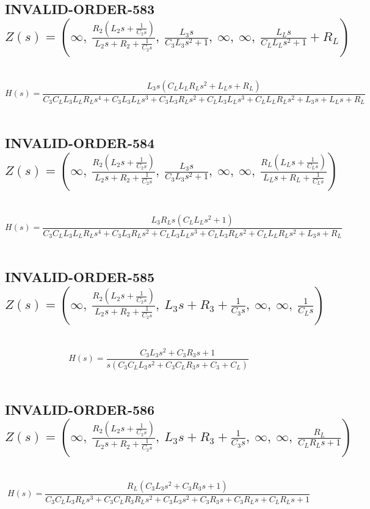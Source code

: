 \documentclass{article}
\begin{document}
\subsection{INVALID-ORDER-583 $Z(s) = \left( \infty, \  \frac{R_{2} \left(L_{2} s + \frac{1}{C_{2} s}\right)}{L_{2} s + R_{2} + \frac{1}{C_{2} s}}, \  \frac{L_{3} s}{C_{3} L_{3} s^{2} + 1}, \  \infty, \  \infty, \  \frac{L_{L} s}{C_{L} L_{L} s^{2} + 1} + R_{L}\right)$ } \ 
\textbf{\[H(s) = \frac{L_{3} s \left(C_{L} L_{L} R_{L} s^{2} + L_{L} s + R_{L}\right)}{C_{3} C_{L} L_{3} L_{L} R_{L} s^{4} + C_{3} L_{3} L_{L} s^{3} + C_{3} L_{3} R_{L} s^{2} + C_{L} L_{3} L_{L} s^{3} + C_{L} L_{L} R_{L} s^{2} + L_{3} s + L_{L} s + R_{L}}\] } \ 
\subsection{INVALID-ORDER-584 $Z(s) = \left( \infty, \  \frac{R_{2} \left(L_{2} s + \frac{1}{C_{2} s}\right)}{L_{2} s + R_{2} + \frac{1}{C_{2} s}}, \  \frac{L_{3} s}{C_{3} L_{3} s^{2} + 1}, \  \infty, \  \infty, \  \frac{R_{L} \left(L_{L} s + \frac{1}{C_{L} s}\right)}{L_{L} s + R_{L} + \frac{1}{C_{L} s}}\right)$ } \ 
\textbf{\[H(s) = \frac{L_{3} R_{L} s \left(C_{L} L_{L} s^{2} + 1\right)}{C_{3} C_{L} L_{3} L_{L} R_{L} s^{4} + C_{3} L_{3} R_{L} s^{2} + C_{L} L_{3} L_{L} s^{3} + C_{L} L_{3} R_{L} s^{2} + C_{L} L_{L} R_{L} s^{2} + L_{3} s + R_{L}}\] } \ 
\subsection{INVALID-ORDER-585 $Z(s) = \left( \infty, \  \frac{R_{2} \left(L_{2} s + \frac{1}{C_{2} s}\right)}{L_{2} s + R_{2} + \frac{1}{C_{2} s}}, \  L_{3} s + R_{3} + \frac{1}{C_{3} s}, \  \infty, \  \infty, \  \frac{1}{C_{L} s}\right)$ } \ 
\textbf{\[H(s) = \frac{C_{3} L_{3} s^{2} + C_{3} R_{3} s + 1}{s \left(C_{3} C_{L} L_{3} s^{2} + C_{3} C_{L} R_{3} s + C_{3} + C_{L}\right)}\] } \ 
\subsection{INVALID-ORDER-586 $Z(s) = \left( \infty, \  \frac{R_{2} \left(L_{2} s + \frac{1}{C_{2} s}\right)}{L_{2} s + R_{2} + \frac{1}{C_{2} s}}, \  L_{3} s + R_{3} + \frac{1}{C_{3} s}, \  \infty, \  \infty, \  \frac{R_{L}}{C_{L} R_{L} s + 1}\right)$ } \ 
\textbf{\[H(s) = \frac{R_{L} \left(C_{3} L_{3} s^{2} + C_{3} R_{3} s + 1\right)}{C_{3} C_{L} L_{3} R_{L} s^{3} + C_{3} C_{L} R_{3} R_{L} s^{2} + C_{3} L_{3} s^{2} + C_{3} R_{3} s + C_{3} R_{L} s + C_{L} R_{L} s + 1}\] } \ 
\end{document}
